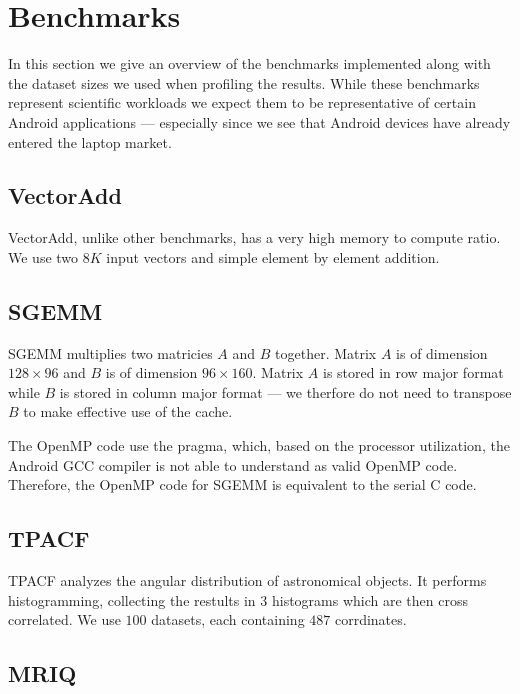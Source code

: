 \section{Benchmarks}

In this section we give an overview of the benchmarks implemented along with 
	the dataset sizes we used when profiling the results.
While these benchmarks represent scientific workloads we expect them to be 
	representative of certain Android applications --- especially since we 
	see that Android devices have already entered the laptop market.

\subsection{VectorAdd}

VectorAdd, unlike other benchmarks, has a very high memory to compute ratio.
We use two $8K$ input vectors and simple element by element addition.

\subsection{SGEMM}


SGEMM multiplies two matricies $A$ and $B$ together.
Matrix $A$ is of dimension $128 \times 96$ and $B$ is of dimension $96 \times 160$.
Matrix $A$ is stored in row major format while $B$ is stored in column major format --- we therfore do not need to transpose $B$ to make effective use of the cache.

The OpenMP code use the  pragma, which, based on the processor utilization, the Android GCC compiler is not able to understand as valid OpenMP code.
Therefore, the OpenMP code for SGEMM is equivalent to the serial C code.

\subsection{TPACF}

TPACF analyzes the angular distribution of astronomical objects.
It performs histogramming, collecting the restults in 3 histograms which are then
	cross correlated.
We use $100$ datasets, each containing $487$ corrdinates.

\subsection{MRIQ}

